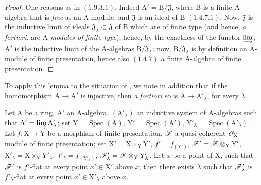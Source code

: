 \begin{proof}
One reasons as in $(1.9.3.1)$. Indeed $\mathrm{A}'=\mathrm{B}/\mathfrak{J}$, where $\mathrm{B}$ is a finite $\mathrm{A}$-algebra
that is \emph{free} as an $\mathrm{A}$-module, and $\mathfrak{J}$ is an ideal of $\mathrm{B}$ $(1.4.7.1)$. Now, $\mathfrak{J}$ is the inductive
limit of ideals $\mathfrak{J}_\lambda\subset\mathfrak{J}$ of $\mathrm{B}$ which are of finite type (and hence, \emph{a fortiori}, are $\mathrm{A}$-\emph{modules of finite type}),
hence,
by the exactness of the functor $\varinjlim$, $\mathrm{A}'$ is the inductive limit of the $\mathrm{A}$-algebras $\mathrm{B}/\mathfrak{J}_\lambda$; now, $\mathrm{B}/\mathfrak{J}_\lambda$
is by definition an $\mathrm{A}$-module of finite presentation, hence also $(1.4.7)$ a finite $\mathrm{A}$-algebra
of finite presentation.
\end{proof}


To apply this lemma to the situation of , we note in addition
that if the homomorphism $\mathrm{A}\to\mathrm{A}'$ is injective, then
\emph{a fortiori} so is $\mathrm{A}\to\mathrm{A}'_\lambda$, for every
$\lambda$.

\begin{lemma}[11.5.5.2]
\label{IV.11.5.5.2}
Let $\mathrm{A}$ be a ring, $\mathrm{A}'$ an $\mathrm{A}$-algebra, $(\mathrm{A}'_\lambda)$ an inductive system
of $\mathrm{A}$-algebras such that $\mathrm{A}'=\varinjlim\mathrm{A}'_\lambda$; set $\mathrm{Y}=\operatorname{Spec}(\mathrm{A})$, $\mathrm{Y}'=\operatorname{Spec}(\mathrm{A}')$, $\mathrm{Y}'_\lambda=\operatorname{Spec}(\mathrm{A}'_\lambda)$.
Let $f:\mathrm{X}\to\mathrm{Y}$ be a morphism of finite presentation, $\mathscr{F}$ a quasi-coherent $\mathscr{O}_\mathrm{X}$-module of finite
presentation; set $\mathrm{X}'=\mathrm{X}\times_\mathrm{Y}\mathrm{Y}'$, $f'=f_{(\mathrm{Y}')}$, $\mathscr{F}'=\mathscr{F}\otimes_\mathrm{Y}\mathrm{Y}'$, $\mathrm{X}'_\lambda=\mathrm{X}\times_\mathrm{Y}\mathrm{Y}'_\lambda$, $f'_\lambda=f_{(\mathrm{Y}'_\lambda)}$,
$\mathscr{F}'_\lambda=\mathscr{F}\otimes_\mathrm{Y}\mathrm{Y}'_\lambda$. Let $x$ be a point of $\mathrm{X}$, such that $\mathscr{F}'$ is $f'$-flat at every point $x'\in\mathrm{X}'$ above $x$;
then there exists $\lambda$ such that $\mathscr{F}'_\lambda$ is $f'_\lambda$-flat at every point $x'\in\mathrm{X}'_\lambda$ above $x$.
\end{lemma}


